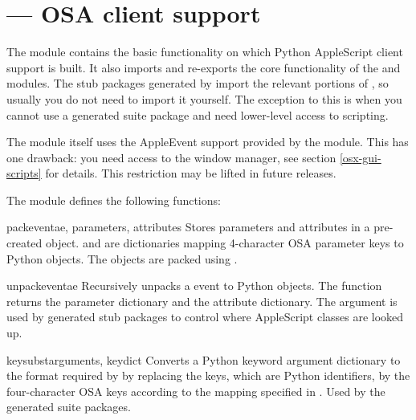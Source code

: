 \section{ ---
         OSA client support}



The  module contains the basic functionality
on which Python AppleScript client support is built. It also
imports and re-exports the core functionality of the
 and  modules. The stub packages
generated by  import the relevant
portions of , so usually you do not need to
import it yourself. The exception to this is when you
cannot use a generated suite package and need lower-level
access to scripting.

The  module itself uses the AppleEvent support
provided by the  module. This has one drawback:
you need access to the window manager, see section \ref{osx-gui-scripts}
for details. This restriction may be lifted in future releases.


The  module defines the following functions:

\begin{funcdesc}{packevent}{ae, parameters, attributes}
Stores parameters and attributes in a pre-created 
object.  and  are 
dictionaries mapping 4-character OSA parameter keys to Python objects. The
objects are packed using .
\end{funcdesc}

\begin{funcdesc}{unpackevent}{ae}
Recursively unpacks a  event to Python objects.
The function returns the parameter dictionary and the attribute dictionary.
The  argument is used by generated stub packages to
control where AppleScript classes are looked up.
\end{funcdesc}

\begin{funcdesc}{keysubst}{arguments, keydict}
Converts a Python keyword argument dictionary  to
the format required by  by replacing the keys,
which are Python identifiers, by the four-character OSA keys according
to the mapping specified in . Used by the generated suite
packages.
\end{funcdesc}

